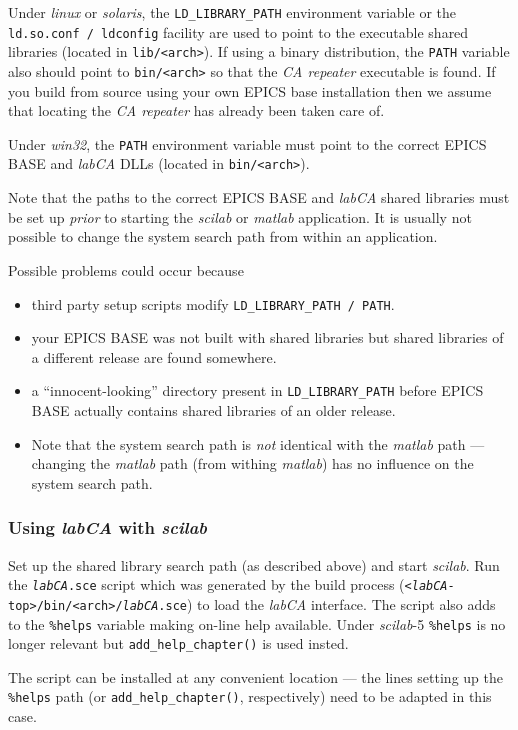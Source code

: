 \documentclass{article}
\newcommand{\sca}{\ita{labCA}}
\newcommand{\scilab}{\ita{scilab}}
\newcommand{\matlab}{\ita{matlab}}
\newcommand{\windoze}{\ita{win32}}
\newcommand{\com}[1]{{\tt #1}}
\newcommand{\ita}[1]{\emph{#1}}
\begin{document}
Under \ita{linux} or \ita{solaris}, the \com{LD\_LIBRARY\_PATH} environment
variable or the \com{ld.so.conf / ldconfig} facility are used to point
to the executable shared libraries (located in \com{lib/<arch>}).
If using a binary distribution, the \com{PATH} variable also should point
to \com{bin/<arch>} so that the \ita{CA repeater} executable is found.
If you build from source using your own EPICS base installation then
we assume that locating the \ita{CA repeater} has already been taken
care of.

Under \windoze{}, the \com{PATH} environment variable must point to the
correct EPICS BASE and \sca{} DLLs (located in \com{bin/<arch>}).

Note that the paths to the correct EPICS BASE and \sca{} shared libraries
must be set up \ita{prior} to starting the \scilab{} or \matlab{} application.
It is usually not possible to change the system search
path from within an application.

Possible problems could occur because
\begin{itemize}
\item third party setup scripts modify \com{LD\_LIBRARY\_PATH / PATH}.
\item your EPICS BASE was not built with shared libraries but shared libraries
of a different release are found somewhere.
\item a ``innocent-looking'' directory present in \com{LD\_LIBRARY\_PATH}
before EPICS BASE actually contains shared libraries of an older release.
\item Note that the system search path is \ita{not} identical with the
\matlab{} path --- changing the \matlab{} path (from withing \matlab)
has no influence on the system search path.
\end{itemize}

\subsubsection{Using \sca{} with \scilab}
Set up the shared library search path (as described above) and start
\scilab. Run the \com{\sca.sce} script which was generated by the build process
(\com{<\sca-top>/bin/<arch>/\sca.sce}) to load the \sca{} interface.
The script also adds to the \com{\%helps} variable making on-line
help available. Under \scilab{-5} \com{\%helps} is no longer relevant
but \com{add\_help\_chapter()} is used insted.

The script can be installed at any convenient location --- the lines
setting up the \com{\%helps} path (or \com{add\_help\_chapter()}, respectively)
need to be adapted in this case.
\end{document}

